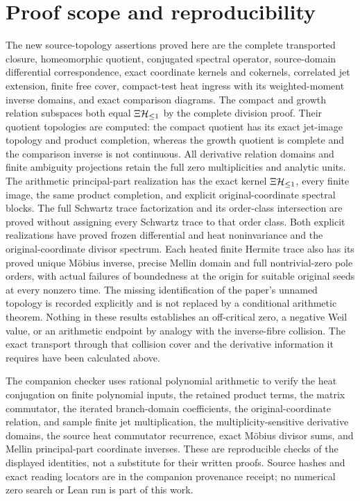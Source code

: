 \section{Proof scope and reproducibility}
The new source-topology assertions proved here are the complete
transported closure, homeomorphic quotient, conjugated spectral
operator, source-domain differential correspondence, exact coordinate
kernels and cokernels, correlated jet extension, finite free cover,
compact-test heat ingress with its weighted-moment inverse domains,
and exact comparison diagrams. The compact and growth relation
subspaces both equal $\Xi\mathcal H_{\leq 1}$ by the complete division proof.
Their quotient topologies are computed: the compact quotient has
its exact jet-image topology and product completion, whereas the
growth quotient is complete and the comparison inverse is not
continuous. All derivative relation domains and finite ambiguity
projections retain the full zero multiplicities and analytic units.
The arithmetic principal-part realization has the exact kernel
$\Xi\mathcal H_{\leq 1}$, every finite image, the same product completion,
and explicit original-coordinate spectral blocks. The full Schwartz
trace factorization and its order-class intersection are proved
without assigning every Schwartz trace to that order class.
Both explicit realizations have proved frozen differential and
heat noninvariance and the original-coordinate divisor spectrum.
Each heated finite Hermite trace also has its proved unique
M\"obius inverse, precise Mellin domain and full nontrivial-zero
pole orders, with actual failures of boundedness at the origin
for suitable original seeds at every nonzero time.
The missing identification of the paper's unnamed topology is
recorded explicitly and is not replaced by a conditional arithmetic
theorem. Nothing in these results establishes an off-critical zero,
a negative Weil value, or an arithmetic endpoint by analogy with
the inverse-fibre collision. The exact transport through that
collision cover and the derivative information it requires have
been calculated above.

The companion checker uses rational polynomial arithmetic to verify
the heat conjugation on finite polynomial inputs, the retained
product terms, the matrix commutator, the iterated branch-domain
coefficients, the original-coordinate relation, and sample finite
jet multiplication, the multiplicity-sensitive derivative domains,
the source heat commutator recurrence, exact M\"obius divisor sums,
and Mellin principal-part coordinate inverses.
These are reproducible checks of the displayed
identities, not a substitute for their written proofs. Source
hashes and exact reading locators are in the companion provenance
receipt; no numerical zero search or Lean run is part of this work.
